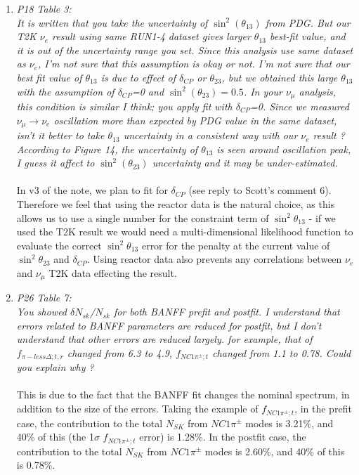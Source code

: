 \begin{enumerate}
  \vspace{5 mm}
\item
  {\em
    P18 Table 3:\\
    It is written that you take the uncertainty of $\sin^2(\theta_{13})$ from PDG.
    But our T2K $\nu_e$ result using same RUN1-4 dataset gives larger $\theta_{13}$ best-fit value,
    and it is out of the uncertainty range you set. Since this analysis use same dataset as $\nu_e$,
    I'm not sure that this assumption is okay or not.
    I'm not sure that our best fit value of $\theta_{13}$ is due to effect of $\delta_{CP}$ or $\theta_{23}$,
    but we obtained this large $\theta_{13}$ with the assumption of $\delta_{CP}$=0 and $\sin^2(\theta_{23})=0.5$.
    In your $\nu_\mu$ analysis, this condition is similar I think; you apply fit with $\delta_{CP}$=0.
    Since we measured $\nu_\mu \rightarrow \nu_e$ oscillation more than expected by PDG value in the same dataset,
    isn't it better to take $\theta_{13}$ uncertainty in a consistent way with our $\nu_e$ result ?
    According to Figure 14, the uncertainty of $\theta_{13}$ is seen around oscillation peak,
    I guess it affect to $\sin^2(\theta_{23})$ uncertainty and it may be under-estimated.
  }\\
  \\
  In v3 of the note, we plan to fit for $\delta_{CP}$ (see reply to Scott's comment 6).
  Therefore we feel that using the reactor data is the natural choice,
  as this allows us to use a single number for the constraint term of $\sin^2\theta_{13}$ -
  if we used the T2K result we would need a multi-dimensional likelihood function
  to evaluate the correct $\sin^2\theta_{13}$ error for the penalty at the current value of
  $\sin^2\theta_{23}$ and $\delta_{CP}$.
  Using reactor data also prevents any correlations between $\nu_e$ and $\nu_\mu$ T2K
  data effecting the result.
  

  \vspace{5 mm}
\item
  {\em
    P26 Table 7:\\
    You showed $\delta N_{sk}$/$N_{sk}$ for both BANFF prefit and postfit.
    I understand that errors related to BANFF parameters are reduced for postfit,
    but I don't understand that other errors are reduced largely. for example, that of
    $f_{\pi-less\Delta; t, r}$ changed from 6.3 to 4.9, $f_{NC1\pi^\pm; t}$ changed from 1.1 to 0.78.  Could you explain why ?
  }\\
  \\
  This is due to the fact that the BANFF fit changes the nominal spectrum, in addition to the size of the errors.
  Taking the example of $f_{NC1\pi^\pm; t}$,
  in the prefit case, the contribution to the total $N_{SK}$ from $NC1\pi^\pm$ modes is 3.21\%,%
  and 40\% of this (the 1$\sigma$ $f_{NC1\pi^\pm; t}$ error) is 1.28\%.
  In the postfit case, the contribution to the total $N_{SK}$ from $NC1\pi^\pm$ modes is 2.60\%,%
  and 40\% of this is 0.78\%.


\end{enumerate}
